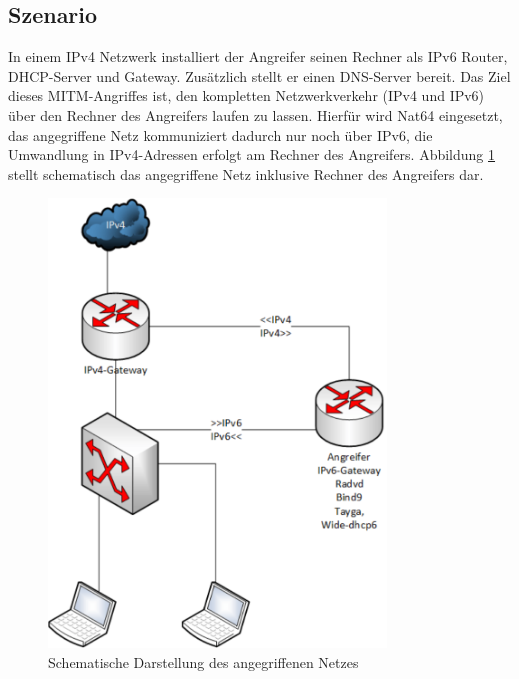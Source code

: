 \subsection*{Szenario}
In einem IPv4 Netzwerk installiert der Angreifer seinen Rechner als IPv6 Router, DHCP-Server und Gateway. Zusätzlich stellt er einen DNS-Server bereit. Das Ziel dieses MITM-Angriffes ist, den kompletten Netzwerkverkehr (IPv4 und IPv6) über den Rechner des Angreifers laufen zu lassen. Hierfür wird Nat64 eingesetzt, das angegriffene Netz kommuniziert dadurch nur noch über IPv6, die Umwandlung in IPv4-Adressen erfolgt am Rechner des Angreifers. Abbildung \ref{fig:fakeIpv6_szenario} stellt schematisch das angegriffene Netz inklusive Rechner des Angreifers dar.
\begin{figure}[h!]
	\centering
	\includegraphics[width=0.8\textwidth]{bilder/fakeIPv6/fakeIpv6_szenario.pdf}
	\caption{Schematische Darstellung des angegriffenen Netzes}
	\label{fig:fakeIpv6_szenario}
\end{figure}

